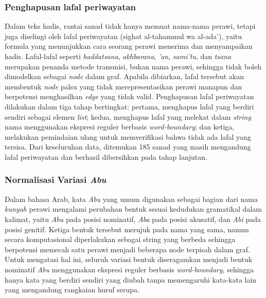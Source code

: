 \subsubsection{Penghapusan lafal periwayatan}
Dalam teks hadis, rantai sanad tidak hanya memuat nama-nama perawi, tetapi juga diselingi oleh lafal periwayatan (sighat al-tahammul wa al-ada'), yaitu formula yang menunjukkan cara seorang perawi menerima dan menyampaikan hadis. Lafal-lafal seperti \textit{haddatsana}, \textit{akhbarana}, \textit{'an}, \textit{sami'tu}, dan \textit{tsana} merupakan penanda metode transmisi, bukan nama perawi, sehingga tidak boleh dimodelkan sebagai \textit{node} dalam graf. Apabila dibiarkan, lafal tersebut akan membentuk \textit{node} palsu yang tidak merepresentasikan perawi manapun dan berpotensi menghasilkan \textit{edge} yang tidak valid. Penghapusan lafal periwayatan dilakukan dalam tiga tahap bertingkat: pertama, menghapus lafal yang berdiri sendiri sebagai elemen \textit{list}; kedua, menghapus lafal yang melekat dalam \textit{string} nama menggunakan ekspresi reguler berbasis \textit{word-boundary}; dan ketiga, melakukan pemindaian ulang untuk memverifikasi bahwa tidak ada lafal yang tersisa. Dari keseluruhan data, ditemukan 185 sanad yang masih mengandung lafal periwayatan dan berhasil dibersihkan pada tahap lanjutan.

\subsubsection{Normalisasi Variasi \textit{Abu}}
Dalam bahasa Arab, kata \textit{Abu} yang umum digunakan sebagai bagian dari nama \textit{kunyah} perawi mengalami perubahan bentuk sesuai kedudukan gramatikal dalam kalimat, yaitu \textit{Abu} pada posisi nominatif, \textit{Aba} pada posisi akusatif, dan \textit{Abi} pada posisi genitif. Ketiga bentuk tersebut merujuk pada nama yang sama, namun secara komputasional diperlakukan sebagai string yang berbeda sehingga berpotensi memecah satu perawi menjadi beberapa node terpisah dalam graf. Untuk mengatasi hal ini, seluruh variasi bentuk diseragamkan menjadi bentuk nominatif \textit{Abu} menggunakan ekspresi reguler berbasis \textit{word-boundary}, sehingga hanya kata yang berdiri sendiri yang diubah tanpa memengaruhi kata-kata lain yang mengandung rangkaian huruf serupa.
